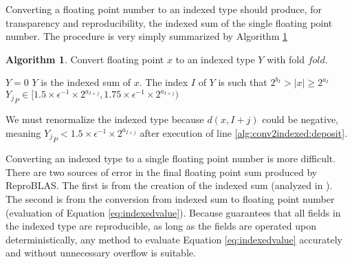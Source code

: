 \documentclass[12pt]{article}
\theoremstyle{definition}
\newtheorem{alg}{Algorithm}[section]
\numberwithin{equation}{section}
\begin{document}
    Converting a floating point number to an indexed type should produce, for transparency and reproducibility, the indexed sum of the single floating point number.
    The procedure is very simply summarized by Algorithm \ref{alg:conv2indexed}
    \begin{alg}
      Convert floating point $x$ to an indexed type $Y$ with fold $fold$.
      \begin{algorithmic}[1]
          \State $Y = 0$
          \State {}
          \State {} \label{alg:conv2indexed:deposit}
          \State {}
        \EndFunction
        \Ensure
          $Y$ is the indexed sum of $x$.
          The index $I$ of $Y$ is such that $2^{b_I} > |x| \geq 2^{a_I}$
          ${Y_j}_P \in [1.5 \times \epsilon^{-1}\times 2^{a_{I + j}}, 1.75 \times \epsilon^{-1}\times 2^{a_{I + j}})$
      \end{algorithmic}
      \label{alg:conv2indexed}
    \end{alg}

    We must renormalize the indexed type because $d(x, I + j)$ could be negative, meaning ${Y_j}_P < 1.5 \times \epsilon^{-1}\times 2^{a_{I + j}}$ after execution of line \ref{alg:conv2indexed:deposit}.

    Converting an indexed type to a single floating point number is more difficult. There are two sources of error in the final floating point sum produced by ReproBLAS. The first is from the creation of the indexed sum (analyzed in \cite{repsum}). The second is from the conversion from indexed sum to floating point number (evaluation of Equation \ref{eq:indexedvalue}).
    Because \cite{repsum} guarantees that all fields in the indexed type are reproducible, as long as the fields are operated upon deterministically, any method to evaluate Equation \ref{eq:indexedvalue} accurately and without unnecessary overflow is suitable.
\end{document}
